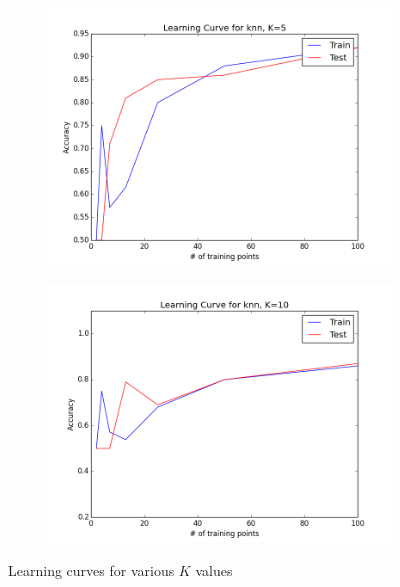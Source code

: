 \documentclass{article}
\begin{document}
\begin{figure} [h!]
\begin{subfigure} [h!]{.4\textwidth}
		\includegraphics[scale = .45]{LC_k5.png}
		\end{subfigure}
		\hfill
		\begin{subfigure} [h!]{.4\textwidth}
		\includegraphics[scale = .45]{LC_k10.png}
		\end{subfigure}
		\caption{Learning curves for various $K$ values}
		\label{k_figs}
	\end{figure}
	
	
	\FloatBarrier	
\end{document}
